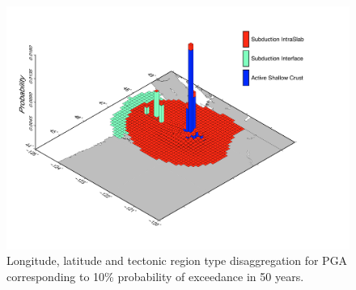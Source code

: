 \begin{figure}
\centering
\includegraphics[width=14cm]{./Pictures/Seattle_Lon_Lat_TRT.pdf}
\caption{Longitude, latitude and tectonic region type disaggregation for PGA corresponding to 10\% probability of exceedance in 50 years.}
\label{fig:seattle_lonlattrt}
\end{figure}

